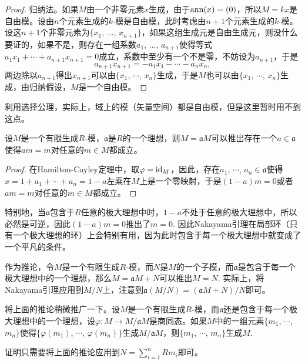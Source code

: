 \begin{proof}
	归纳法。如果$M$由一个非零元素$x$生成，由于$\operatorname{ann}(x)=(0)$，所以$M=kx$是自由模。设由$n$个元素生成的$k$-模是自由模，此时考虑由$n+1$个元素生成的$k$-模。设这$n+1$个非零元素为$\{x_1$, $\dots$, $x_{n+1}\}$，如果这组生成元是自由生成元，则没什么要证的，如果不是，则存在一组系数$a_1$, $\dots$, $a_{n+1}$使得等式$a_1x_1+\cdots+a_{n+1}x_{n+1}=0$成立，系数中至少有一个不是零，不妨设为$a_{n+1}$，于是
	\[
	a_{n+1}x_{n+1}=-a_1x_1-\cdots-a_nx_n,
	\]
	两边除以$a_{n+1}$得出$x_{n+1}$可以由$\{x_1$, $\cdots$, $x_{n}\}$生成，于是$M$也可以由$\{x_1$, $\cdots$, $x_{n}\}$生成，由归纳假设，$M$是一个自由模。
\end{proof}

利用选择公理，实际上，域上的模（矢量空间）都是自由模，但是这里暂时用不到这点。

\begin{thm}[Nakayama引理]
设$M$是一个有限生成$R$-模，$\mathfrak{a}$是$R$的一个理想，则$M=\mathfrak{a}M$可以推出存在一个$a\in \mathfrak{a}$使得$am=m$对任意的$m\in M$都成立。
\end{thm}

\begin{proof}
	在Hamilton-Cayley定理中，取$\varphi=\operatorname{id}_M$，因此，存在$a_1$, $\cdots$, $a_n\in \mathfrak{a}$使得$x=1+a_1+\cdots+a_n=1-a$左乘在$M$上是一个零映射，于是$(1-a)m=0$或者$am=m$对任意的$m\in M$都成立。
\end{proof}

特别地，当$\mathfrak{a}$包含于$R$任意的极大理想中时，$1-a$不处于任意的极大理想中，所以必然是可逆，因此$(1-a)m=0$推出了$m=0$. 因此Nakayama引理在局部环（只有一个极大理想的环）上会特别有用，因为此时包含于每一个极大理想中就变成了一个平凡的条件。

作为推论，令$M$是一个有限生成$R$-模，而$N$是$M$的一个子模，而$\mathfrak{a}$是包含于每一个极大理想中的一个理想，那么$M=\mathfrak{a}M+N$可以推出$M=N$. 实际上，将Nakayama引理应用到$M/N$上，注意到$\mathfrak{a}(M/N)=(\mathfrak{a}M+N)/N$即可。

\begin{pro}
将上面的推论稍微推广一下。设$M$是一个有限生成$R$-模，而$\mathfrak{a}$还是包含于每一个极大理想中的一个理想，设$\varphi:M\to M/\mathfrak{a}M$是商同态。如果$M$中的一组元素$\{m_1$, $\cdots$, $m_n\}$使得$\{\varphi(m_1)$, $\cdots$, $\varphi(m_n)\}$生成$M/\mathfrak{a}M$，则$\{m_1$, $\cdots$, $m_n\}$生成$M$.
\end{pro}

证明只需要将上面的推论应用到$N=\sum_{i=1}^n Rm_i$即可。

